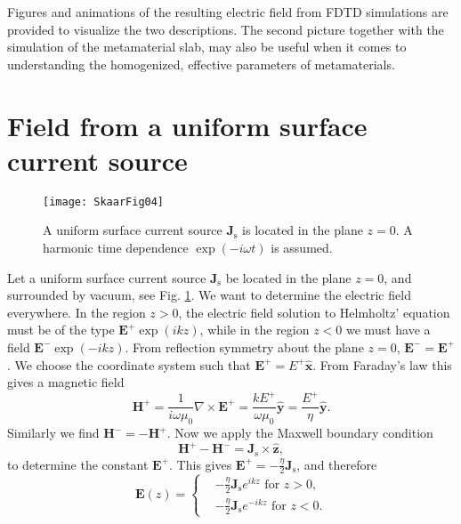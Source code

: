 \documentclass[prb,twocolumn]{revtex4-1}
\newcommand{\vek}[1]{\mathbf{#1}}
\newcommand{\vekh}[1]{\mathbf{\hat{#1}}}
\newcommand{\curl}{\nabla\times\vek}
\newcommand{\be}{\begin{equation}}
\newcommand{\ee}{\end{equation}}
\begin{document}
Figures and animations of the resulting electric field from FDTD simulations are provided to visualize the two descriptions. The second picture together with the simulation of the metamaterial slab, may also be useful when it comes to understanding the homogenized, effective parameters of metamaterials.

\appendix
\section{Field from a uniform surface current source}\label{sec:currentsheet}
\begin{figure}[bh]
\begin{center}
\texttt{[image: SkaarFig04]}
\caption{A uniform surface current source $\vek J_\text{s}$ is located in the plane $z=0$. A harmonic time dependence $\exp(-i\omega t)$ is assumed.}
\label{fig:currentsource}
\end{center}
\end{figure}
Let a uniform surface current source $\vek J_\text{s}$ be located in the plane $z=0$, and surrounded by vacuum, see Fig. \ref{fig:currentsource}. We want to determine the electric field everywhere. In the region $z>0$, the electric field solution to Helmholtz' equation must be of the type $\vek E^+\exp(ikz)$, while in the region $z<0$ we must have a field $\vek E^-\exp(-ikz)$. From reflection symmetry about the plane $z=0$, $\vek E^-=\vek E^+$. We choose the coordinate system such that $\vek E^+=E^+\vekh x$. From Faraday's law this gives a magnetic field
\be
\vek H^+ = \frac{1}{i\omega\mu_0} \curl E^+ = \frac{kE^+}{\omega\mu_0}\vekh y = \frac{E^+}{\eta}\vekh y.
\ee
Similarly we find $\vek H^-=-\vek H^+$. Now we apply the Maxwell boundary condition 
\be
\vek H^+-\vek H^-=\vek J_\text{s}\times\vekh z,
\ee
to determine the constant $\vek E^+$. This gives $\vek E^+=-\frac{\eta}{2}\vek J_\text{s}$, and therefore
\be
\vek E(z) =
\begin{cases}
&-\frac{\eta}{2} \vek J_\text{s} e^{ikz} \text{ for $z>0$}, \\ 
&-\frac{\eta}{2} \vek J_\text{s} e^{-ikz} \text{ for $z<0$}.
\end{cases}
\ee
\end{document}
